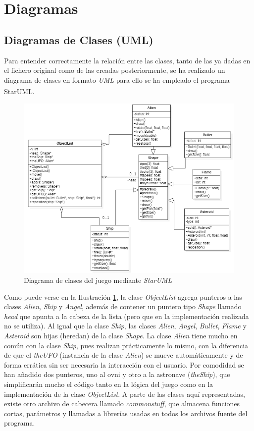 \section{Diagramas}
\subsection{Diagramas de Clases (UML)}
Para entender correctamente la relación entre las clases, tanto de las ya dadas en el fichero original como de las creadas posteriormente, se ha realizado un diagrama de clases en formato \emph{UML} para ello se ha empleado el programa StarUML\textsuperscript{\textregistered}.

\begin{figure}[H]
    \centering
    \includegraphics[width=\textwidth]{fotos/UML.PNG}
    \caption{Diagrama de clases del juego mediante \emph{StarUML}}
    \label{uml}
\end{figure}

Como puede verse en la Ilustración \ref{uml}, la clase \emph{ObjectList} agrega punteros a las clases \emph{Alien}, \emph{Ship} y \emph{Angel}, además de contener un puntero tipo \emph{Shape} llamado \textit{head} que apunta a la cabeza de la lista (pero que en la implementación realizada no se utiliza). Al igual que la clase \emph{Ship}, las clases \emph{Alien}, \emph{Angel}, \emph{Bullet}, \emph{Flame} y \emph{Asteroid} son hijas (heredan) de la clase \emph{Shape}. La clase \emph{Alien} tiene mucho en común con la clase \emph{Ship}, pues realizan prácticamente lo mismo, con la diferencia de que el \emph{theUFO} (instancia de la clase \emph{Alien}) se mueve automáticamente y de forma errática sin ser necesaria la interacción con el usuario. Por comodidad se han añadido dos punteros, uno al ovni y otro a la astronave (\emph{theShip}), que simplificarán mucho el código tanto en la lógica del juego como en la implementación de la clase \emph{ObjectList}.
A parte de las clases aquí representadas, existe otro archivo de cabecera llamado \emph{commonstuff}, que almacena funciones cortas, parámetros y llamadas a librerías usadas en todos los archivos fuente del programa.

